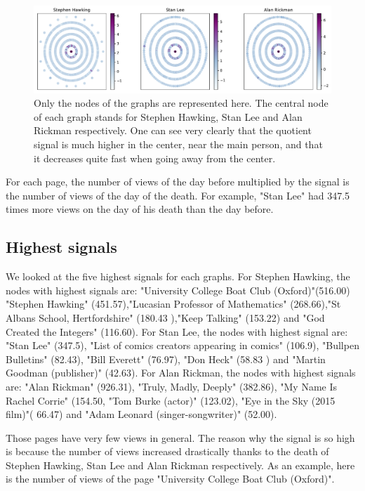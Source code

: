 \documentclass[conference]{IEEEtran}
\begin{document}
\begin{figure}[!htb]
  \includegraphics[width=\linewidth]{signal_scatter.pdf}
\caption{Only the nodes of the graphs are represented here. The central node of each graph stands for Stephen Hawking, Stan Lee and Alan Rickman respectively. One can see very clearly that the quotient signal is much higher in the center, near the main person, and that it decreases quite fast when going away from the center.}
\end{figure}

 For each page, the number of views of the day before multiplied by the signal is the number of views of the day of the death. For example, "Stan Lee" had 347.5 times more views on the day of his death than the day before. 

\subsection{Highest signals}

We looked at the five highest signals for each graphs. For Stephen Hawking, the nodes with highest signals are: "University College Boat Club (Oxford)"(516.00)
"Stephen Hawking" (451.57),"Lucasian Professor of Mathematics" (268.66),"St Albans School, Hertfordshire" (180.43 ),"Keep Talking" (153.22) and "God Created the Integers" (116.60).
\newline
For Stan Lee, the nodes with highest signal are:  "Stan Lee" (347.5), "List of comics creators appearing in comics" (106.9), "Bullpen Bulletins" (82.43), "Bill Everett" (76.97), "Don Heck" (58.83 ) and "Martin Goodman (publisher)" (42.63). 
\newline
For Alan Rickman, the nodes with highest signals are: "Alan Rickman" (926.31), "Truly, Madly, Deeply" (382.86), "My Name Is Rachel Corrie" (154.50, "Tom Burke (actor)" (123.02), "Eye in the Sky (2015 film)"( 66.47) and "Adam Leonard (singer-songwriter)" (52.00). 

\medskip
Those pages have very few views in general. The reason why the signal is so high is because the number of views increased drastically thanks to the death of Stephen Hawking, Stan Lee and Alan Rickman respectively. As an example, here is the number of views of the page "University College Boat Club (Oxford)". 
\end{document}

